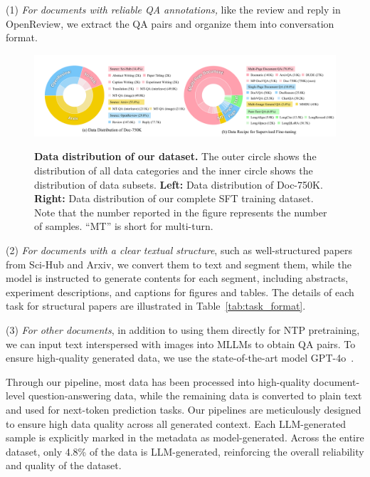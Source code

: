 \documentclass[10pt,twocolumn,letterpaper]{article}
\def\dataname{Doc-750K\xspace}
\begin{document}
\begin{CJK}{UTF8}{gbsn}
(1) \emph{For documents with reliable QA annotations,} like the review and reply in OpenReview, we extract the QA pairs and organize them into conversation format.

\begin{figure}[t!]
    \centering
    {\includegraphics[width=\linewidth]{figure/data.pdf}}
    \caption{
        \textbf{Data distribution of our dataset.}
        The outer circle shows the distribution of all data categories and the inner circle shows the distribution of data subsets.
        \textbf{Left:} Data distribution of {\dataname}.
        \textbf{Right:} Data distribution of our complete SFT training dataset. 
        Note that the number reported in the figure represents the number of samples. ``MT'' is short for multi-turn.
    }
    \label{fig:data_distribution}
    \vspace{-3mm}
\end{figure}

(2) \emph{For documents with a clear textual structure}, such as well-structured papers from Sci-Hub and Arxiv, we convert them to text and segment them, while the model is instructed to generate contents for each segment, including abstracts, experiment descriptions, and captions for figures and tables. The details of each task for structural papers are illustrated in Table~\ref{tab:task_format}. 

(3) \textit{For other documents}, in addition to using them directly for NTP pretraining, we can input text interspersed with images into MLLMs to obtain QA pairs. To ensure high-quality generated data, we use the state-of-the-art model GPT-4o~\cite{gpt4v}. 


Through our pipeline, most data has been processed into high-quality document-level question-answering data, while the remaining data is converted to plain text and used for next-token prediction tasks. Our pipelines are meticulously designed to ensure high data quality across all generated context. Each LLM-generated sample is explicitly marked in the metadata as model-generated. Across the entire dataset, only 4.8\% of the data is LLM-generated, reinforcing the overall reliability and quality of the dataset.


\end{CJK}
\end{document}

